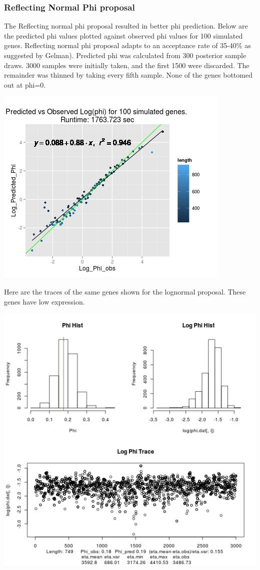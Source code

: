 \documentclass{article}
\begin{document}
 	\subsubsection{Reflecting Normal Phi proposal}
 	
 	The Reflecting normal phi proposal resulted in better phi prediction. Below are the predicted phi values plotted against observed phi values for 100 simulated genes. Reflecting normal phi proposal adapts to an acceptance rate of 35-40\% as suggested by Gelman). Predicted phi was calculated from 300 posterior sample draws. 3000 samples were initially taken, and the first 1500 were discarded. The remainder was thinned by taking every fifth sample. None of the genes bottomed out at phi=0.
 	
 	\includegraphics[scale=0.5]{../chosen_100/3000_steps/BIS10/reflnorm_prop/norand/Rplot01.jpeg}
 	
	\pagebreak 	
 	
 	Here are the traces of the same genes shown for the lognormal proposal. These genes have low expression.
 	
 	\includegraphics[scale=0.5]{../chosen_100/3000_steps/BIS10/reflnorm_prop/hist/11_phi_hist.png}
 	
\end{document}
